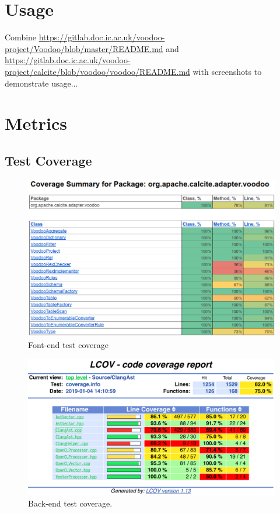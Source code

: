 \chapter{Usage}

Combine \url{https://gitlab.doc.ic.ac.uk/voodoo-project/Voodoo/blob/master/README.md} and \url{https://gitlab.doc.ic.ac.uk/voodoo-project/calcite/blob/voodoo/voodoo/README.md} with screenshots to demonstrate usage...

\chapter{Metrics}
\label{appendix:metrics}

\section{Test Coverage}

\begin{figure}[H]
    \centering
    \includegraphics[width=0.7\linewidth]{evaluation/frontend-coverage.png}
    \caption{Font-end test coverage}
    \label{fig:fontend-cov}
\end{figure}

\begin{figure}[H]
    \centering
    \includegraphics[width=0.75\linewidth]{evaluation/backend-coverage.png}
    \caption{Back-end test coverage.}
    \label{fig:backend-cov}
\end{figure}


